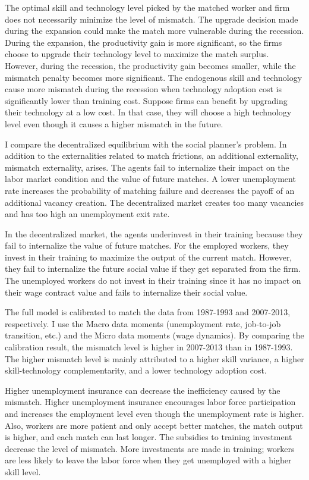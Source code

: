\documentclass[12pt]{article}
\newcommand{\1}{\mathbb{1}}
\begin{document}
The optimal skill and technology level picked by the matched worker and firm does not necessarily minimize the level of mismatch. The upgrade decision made during the expansion could make the match more vulnerable during the recession. During the expansion, the productivity gain is more significant, so the firms choose to upgrade their technology level to maximize the match surplus. However, during the recession, the productivity gain becomes smaller, while the mismatch penalty becomes more significant. The endogenous skill and technology cause more mismatch during the recession when technology adoption cost is significantly lower than training cost. Suppose firms can benefit by upgrading their technology at a low cost. In that case, they will choose a high technology level even though it causes a higher mismatch in the future.  

I compare the decentralized equilibrium with the social planner's problem. In addition to the externalities related to match frictions, an additional externality, mismatch externality, arises. The agents fail to internalize their impact on the labor market condition and the value of future matches. A lower unemployment rate increases the probability of matching failure and decreases the payoff of an additional vacancy creation. The decentralized market creates too many vacancies and has too high an unemployment exit rate.  

In the decentralized market, the agents underinvest in their training because they fail to internalize the value of future matches. For the employed workers, they invest in their training to maximize the output of the current match. However, they fail to internalize the future social value if they get separated from the firm. The unemployed workers do not invest in their training since it has no impact on their wage contract value and fails to internalize their social value. 

The full model is calibrated to match the data from 1987-1993 and 2007-2013, respectively. I use the Macro data moments (unemployment rate, job-to-job transition, etc.) and the Micro data moments (wage dynamics). By comparing the calibration result, the mismatch level is higher in 2007-2013 than in 1987-1993. The higher mismatch level is mainly attributed to a higher skill variance, a higher skill-technology complementarity, and a lower technology adoption cost.  

Higher unemployment insurance can decrease the inefficiency caused by the mismatch. Higher unemployment insurance encourages labor force participation and increases the employment level even though the unemployment rate is higher.  Also, workers are more patient and only accept better matches, the match output is higher, and each match can last longer.  The subsidies to training investment decrease the level of mismatch. More investments are made in training; workers are less likely to leave the labor force when they get unemployed with a higher skill level. 
\end{document}
